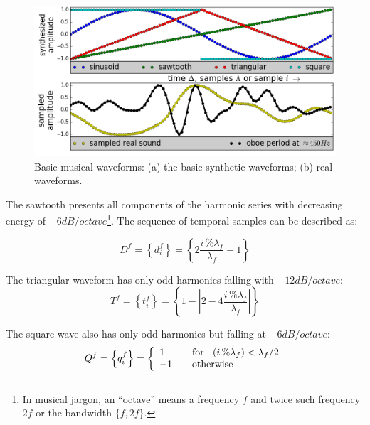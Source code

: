 \begin{figure}
    \centering
        \includegraphics[width=.7\textwidth]{figures/waveForms__}
    \caption{Basic musical waveforms: (a) the basic synthetic  waveforms; (b) real waveforms.}
        \label{fig:formasDeOnda}
\end{figure}

The sawtooth presents all components of the harmonic series with decreasing energy of $-6dB/octave$\footnote{In 
musical jargon, an ``octave'' means a frequency $f$ and twice such frequency $2f$ or the bandwidth $\{f,2f\}$.}. The sequence of temporal samples can be described as:

\begin{equation}\label{sawTooth}
     D^f=\left\{ d^f_i \right\}=\left\{ 2\frac{i\,\%\lambda_f}{\lambda_f} -1 \right\}
\end{equation}

The triangular waveform has only odd harmonics falling with $-12dB/octave$:
\begin{equation}\label{triangular}
     T^f=\left\{ t^f_i \right\}=\left\{1- \left| 2 - 4\frac{i\,\%\lambda_f}{\lambda_f} \right| \right\}
\end{equation}

The square wave also has only odd harmonics but falling at $-6dB/octave$:
\begin{equation}\label{square}
     Q^f=\left\{ q^f_i \right\}= \left\{
         \begin{array}{l l}
              1 & \quad \text{for } \; \; (i\,\%\lambda_f)   <  \lambda_f /2  \\
              -1 & \quad \text{otherwise}\\
         \end{array} \right.
\end{equation}

